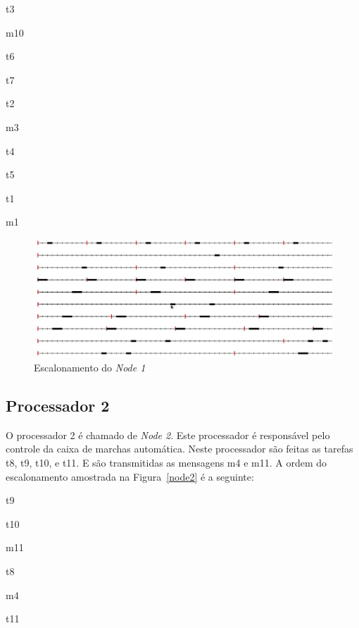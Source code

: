\documentclass[12pt]{article}
\begin{document}
\begin{enumerate}
    \begin{horizlist}{4}{1cm}
    \item t3
    \item m10
    \item t6
    \item t7
    \item t2
    \item m3
    \item t4
    \item t5
    \item t1
    \item m1
    \end{horizlist}
\end{enumerate}

\newpage{}

\begin{figure}[ht]
	\centering
	\includegraphics[width=1\textwidth]{node1.jpg}
    \caption{Escalonamento do \textit{Node 1}}
	\label{node1}
\end{figure}

\subsection{Processador 2}
O processador 2 é chamado de \textit{Node 2}. Este processador é responsável pelo controle da caixa de marchas automática. Neste processador são feitas as tarefas t8, t9, t10, e t11. E são transmitidas as mensagens m4 e m11. 
A ordem do escalonamento amostrada na Figura~\ref{node2} é a seguinte:

\begin{enumerate}
    \begin{horizlist}{3}{1cm}
    \item t9
    \item t10
    \item m11
    \item t8
    \item m4
    \item t11
    \end{horizlist}
\end{enumerate}
\end{document}
